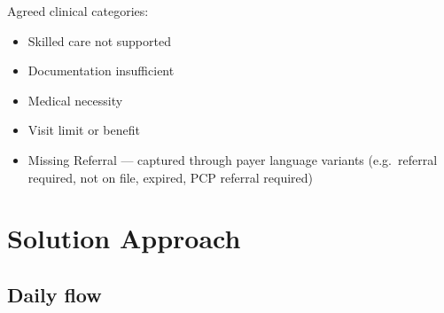 \documentclass[11pt,a4paper]{article}
\begin{document}
Agreed clinical categories:

\begin{itemize}
  \item Skilled care not supported
  \item Documentation insufficient
  \item Medical necessity
  \item Visit limit or benefit
  \item Missing Referral --- captured through payer language variants
        (e.g.\ referral required, not on file, expired, PCP referral required)
\end{itemize}


\section{Solution Approach}

\subsection{Daily flow}
\end{document}
